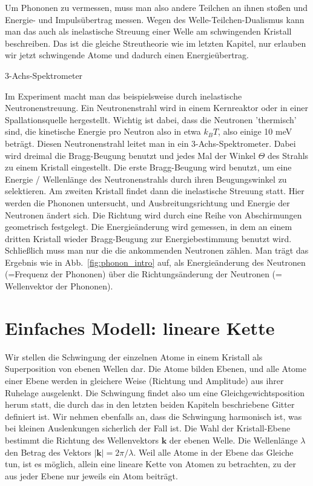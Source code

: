 Um Phononen zu vermessen, muss man also andere Teilchen an ihnen stoßen und Energie- und Impulsübertrag messen. Wegen des Welle-Teilchen-Dualismus kann man das auch als inelastische Streuung einer Welle am schwingenden Kristall beschreiben. Das ist die gleiche Streutheorie wie im letzten Kapitel, nur erlauben wir jetzt schwingende Atome und dadurch einen Energieübertrag.

\begin{marginfigure}
\caption{3-Achs-Spektrometer}

\end{marginfigure}

Im Experiment macht man das beispielsweise durch inelastische Neutronenstreuung. Ein Neutronenstrahl wird in einem Kernreaktor oder in einer Spallationsquelle  hergestellt. Wichtig ist dabei, dass die Neutronen 'thermisch' sind, die kinetische Energie pro  Neutron also in etwa $k_B T$, also einige 10 meV beträgt. Diesen Neutronenstrahl leitet man in ein 3-Achs-Spektrometer. Dabei wird dreimal die Bragg-Beugung benutzt und jedes Mal der Winkel $\Theta$ des Strahls zu einem Kristall eingestellt. Die erste Bragg-Beugung wird benutzt, um eine Energie / Wellenlänge des Neutronenstrahls durch ihren Beugungswinkel zu selektieren. Am zweiten Kristall findet dann die inelastische Streuung statt. Hier werden die Phononen untersucht, und Ausbreitungsrichtung und Energie der Neutronen ändert sich. Die Richtung wird durch eine Reihe von Abschirmungen geometrisch festgelegt. Die Energieänderung wird gemessen, in dem an einem dritten Kristall wieder Bragg-Beugung zur Energiebestimmung benutzt wird. Schließlich muss man nur die die ankommenden Neutronen zählen. Man trägt das Ergebnis wie in Abb.~\ref{fig:phonon_intro} auf, als Energieänderung des Neutronen (=Frequenz der Phononen) über die Richtungsänderung der Neutronen (= Wellenvektor der Phononen).

\section{Einfaches Modell: lineare Kette}

Wir stellen die Schwingung der einzelnen Atome in einem Kristall als Superposition von ebenen Wellen dar. Die Atome bilden Ebenen, und alle Atome einer Ebene werden in gleichere Weise (Richtung und Amplitude) aus ihrer Ruhelage ausgelenkt. Die Schwingung findet also um eine Gleichgewichtsposition herum statt, die durch das in den letzten beiden Kapiteln beschriebene Gitter definiert ist. Wir nehmen ebenfalls an, dass die Schwingung harmonisch ist, was bei kleinen Auslenkungen sicherlich der Fall ist. Die Wahl der Kristall-Ebene bestimmt die Richtung des Wellenvektors $\mathbf{k}$ der ebenen Welle. Die Wellenlänge $\lambda$ den Betrag des Vektors $|\mathbf{k}| = 2 \pi / \lambda$. Weil alle Atome in der Ebene das Gleiche tun, ist es möglich, allein eine lineare Kette von Atomen zu betrachten, zu der aus jeder Ebene nur jeweils ein Atom beiträgt.

